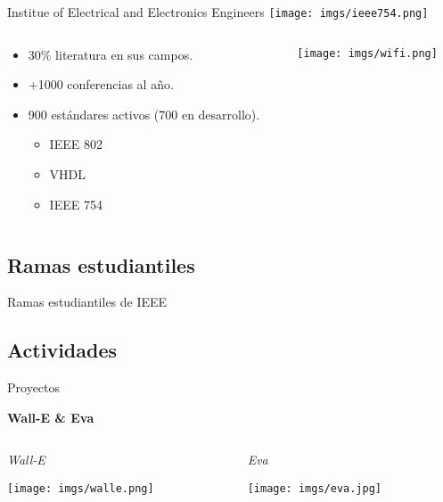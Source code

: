 \begin{frame}{Institue of Electrical and Electronics Engineers}
    \centering
    \texttt{[image: imgs/ieee754.png]}
    
    \begin{columns}\begin{column}{0.6\textwidth}
        \begin{itemize}
            \item 30\% literatura en sus campos.
            \item +1000 conferencias al año.
            \item 900 estándares activos (700 en desarrollo).
            \begin{itemize}
                \item IEEE 802
                \item VHDL
                \item IEEE 754
            \end{itemize}
        \end{itemize}
    \end{column}\begin{column}{0.4\textwidth}
        \texttt{[image: imgs/wifi.png]}
    \end{column}\end{columns}
\end{frame}

\subsection{Ramas estudiantiles}
\begin{frame}{Ramas estudiantiles de IEEE}
\end{frame}

\subsection{Actividades}
\begin{frame}{Proyectos}
    \begin{center}
        \huge\textbf{Wall-E \& Eva}
    \end{center}
    
    \begin{columns}\begin{column}{0.50\textwidth}
        \centering\large\textit{Wall-E}
        
        \texttt{[image: imgs/walle.png]}
    \end{column}\begin{column}{0.50\textwidth}
        \centering\large\textit{Eva}
        
        \texttt{[image: imgs/eva.jpg]}
    \end{column}\end{columns}
\end{frame}